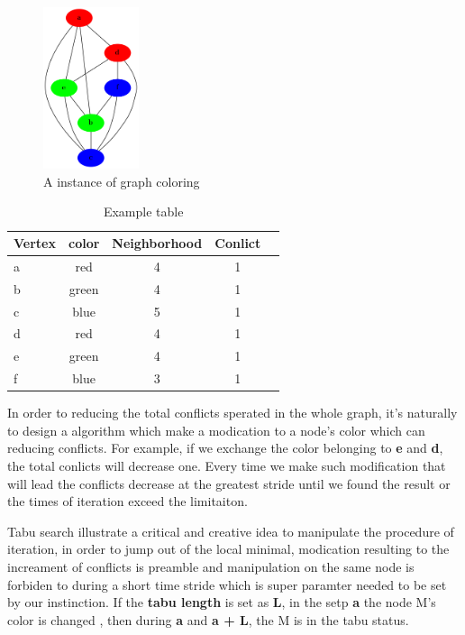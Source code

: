 \documentclass[10pt, a4paper, twocolumn]{article} %
\begin{document}
\begin{figure}[h]
    \centering
    \includegraphics[width=0.25\textwidth]{tabuone.png}
    \caption{A instance of graph coloring}
    \label{tabuone}
\end{figure}

\begin{table}
	\caption{Example table}
	\centering
    \label{tabutable}
    \begin{tabular}{l*{3}{c}r}
        Vertex & color & Neighborhood & Conlict \\
    \hline
    a & red     &4 & 1   \\
    b & green   &4 & 1   \\
    c & blue    &5 & 1   \\
    d & red     &4 & 1   \\
    e & green   &4 & 1   \\
    f & blue    &3 & 1   \\
\end{tabular}
\end{table}
In order to reducing the total conflicts sperated in the whole graph, it's
naturally to design a algorithm which make a modication to a node's color which
can reducing conflicts. For example, if we exchange the color belonging to
\textbf{e} and \textbf{d}, the total conlicts will decrease one. Every time we
make such modification that will lead the conflicts decrease at the greatest
stride until we found the result or the times of iteration exceed the
limitaiton.

Tabu search illustrate a critical and creative idea to manipulate the procedure
of iteration, in order to jump out of the local minimal, modication resulting to
the increament of conflicts is preamble and manipulation on the same node is
forbiden to during a short time stride which is super paramter needed to be set
by our instinction. If the \textbf{tabu length} is set as \textbf{L}, in the
setp \textbf{a} the node M's color is changed , then during \textbf{a} and
\textbf{a + L}, the M is in the tabu status.
\end{document}
